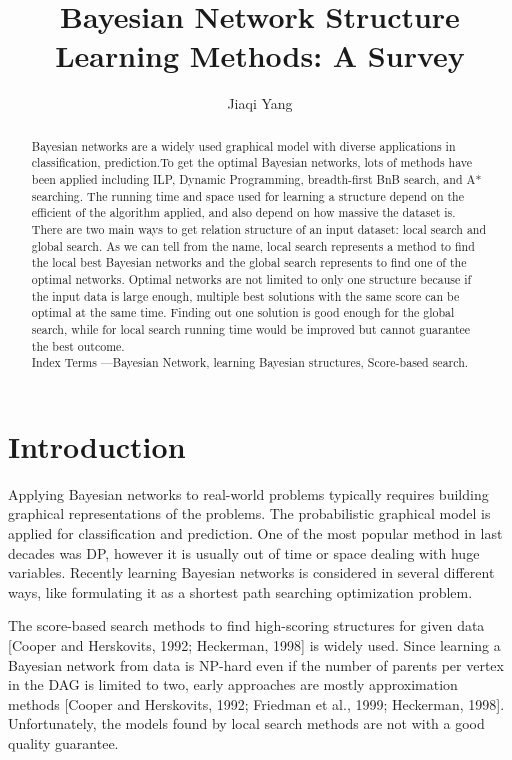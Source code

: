 \documentclass[a4paper,12pt]{article}
\title{Bayesian Network Structure Learning Methods: A Survey}
\author{Jiaqi Yang}
\begin{document}
\maketitle

\begin{abstract}
Bayesian networks are a widely used graphical model with diverse applications in classification, prediction.To get the optimal Bayesian networks, lots of methods have been applied including ILP, Dynamic Programming, breadth-first BnB search, and A* searching. The running time and space used for learning a structure depend on the efficient of the algorithm applied, and also depend on how massive the dataset is. There are two main ways to get relation structure of an input dataset: local search and global search. As we can tell from the name, local search represents a method to find the local best Bayesian networks and the global search represents to find one of the optimal networks. Optimal networks are not limited to only one structure because if the input data is large enough, multiple best solutions with the same score can be optimal at the same time. Finding out one solution is good enough for the global search, while for local search running time would be improved but cannot guarantee the best outcome.\\

Index Terms ---Bayesian Network, learning Bayesian structures, Score-based search.

\end{abstract}

\section{Introduction}
Applying Bayesian networks to real-world problems typically requires building graphical representations of the problems. The probabilistic graphical model is applied for classification and prediction. One of the most popular method in last decades was DP, however it is usually out of time or space dealing with huge variables. Recently learning Bayesian networks is considered in several different ways, like formulating it as a shortest path searching optimization problem. 

The score-based search methods to find high-scoring structures for given data [Cooper and Herskovits, 1992; Heckerman, 1998] is widely used. Since learning a Bayesian network from data is NP-hard even if the number of parents per vertex in the DAG is limited to two, early approaches are mostly approximation methods [Cooper and Herskovits, 1992; Friedman et al., 1999; Heckerman, 1998]. Unfortunately, the models found by local search methods are not with a good quality guarantee.
\end{document}
